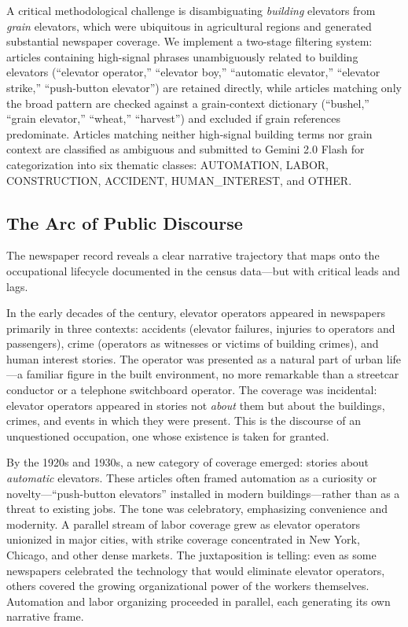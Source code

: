 \documentclass[12pt]{article}
\begin{document}
A critical methodological challenge is disambiguating \emph{building} elevators from \emph{grain} elevators, which were ubiquitous in agricultural regions and generated substantial newspaper coverage. We implement a two-stage filtering system: articles containing high-signal phrases unambiguously related to building elevators (``elevator operator,'' ``elevator boy,'' ``automatic elevator,'' ``elevator strike,'' ``push-button elevator'') are retained directly, while articles matching only the broad pattern are checked against a grain-context dictionary (``bushel,'' ``grain elevator,'' ``wheat,'' ``harvest'') and excluded if grain references predominate. Articles matching neither high-signal building terms nor grain context are classified as ambiguous and submitted to Gemini 2.0 Flash for categorization into six thematic classes: AUTOMATION, LABOR, CONSTRUCTION, ACCIDENT, HUMAN\_INTEREST, and OTHER.

\subsection{The Arc of Public Discourse}

The newspaper record reveals a clear narrative trajectory that maps onto the occupational lifecycle documented in the census data---but with critical leads and lags.

In the early decades of the century, elevator operators appeared in newspapers primarily in three contexts: accidents (elevator failures, injuries to operators and passengers), crime (operators as witnesses or victims of building crimes), and human interest stories. The operator was presented as a natural part of urban life---a familiar figure in the built environment, no more remarkable than a streetcar conductor or a telephone switchboard operator. The coverage was incidental: elevator operators appeared in stories not \emph{about} them but about the buildings, crimes, and events in which they were present. This is the discourse of an unquestioned occupation, one whose existence is taken for granted.

By the 1920s and 1930s, a new category of coverage emerged: stories about \emph{automatic} elevators. These articles often framed automation as a curiosity or novelty---``push-button elevators'' installed in modern buildings---rather than as a threat to existing jobs. The tone was celebratory, emphasizing convenience and modernity. A parallel stream of labor coverage grew as elevator operators unionized in major cities, with strike coverage concentrated in New York, Chicago, and other dense markets. The juxtaposition is telling: even as some newspapers celebrated the technology that would eliminate elevator operators, others covered the growing organizational power of the workers themselves. Automation and labor organizing proceeded in parallel, each generating its own narrative frame.
\end{document}
